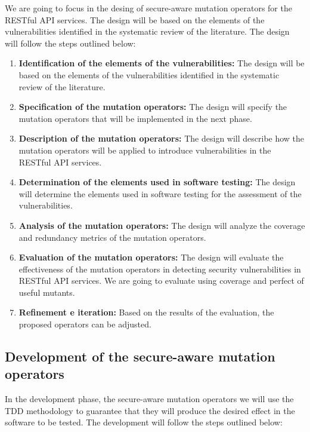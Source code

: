 We are going to focus in the desing of secure-aware mutation operators for the RESTful API services. The design will be based on the elements of the vulnerabilities identified in the systematic review of the literature. The design will follow the steps outlined below:

\begin{enumerate}
  \item \textbf{Identification of the elements of the vulnerabilities:} The design will be based on the elements of the vulnerabilities identified in the systematic review of the literature.
  \item \textbf{Specification of the mutation operators:} The design will specify the mutation operators that will be implemented in the next phase.
  \item \textbf{Description of the mutation operators:} The design will describe how the mutation operators will be applied to introduce vulnerabilities in the RESTful API services.
  \item \textbf{Determination of the elements used in software testing:} The design will determine the elements used in software testing for the assessment of the vulnerabilities.
  \item \textbf{Analysis of the mutation operators:} The design will analyze the coverage and redundancy metrics of the mutation operators.
  \item \textbf{Evaluation of the mutation operators:} The design will evaluate the effectiveness of the mutation operators in detecting security vulnerabilities in RESTful API services. We are going to evaluate using coverage and perfect of useful mutants.
  \item \textbf{Refinement e iteration:} Based on the results of the evaluation, the proposed operators can be adjusted.
\end{enumerate}

\subsection{Development of the secure-aware mutation operators}

In the development phase, the secure-aware mutation operators we will use the TDD methodology\cite{williams2003test} to guarantee that they will produce the desired effect in the software to be tested. The development will follow the steps outlined below:

